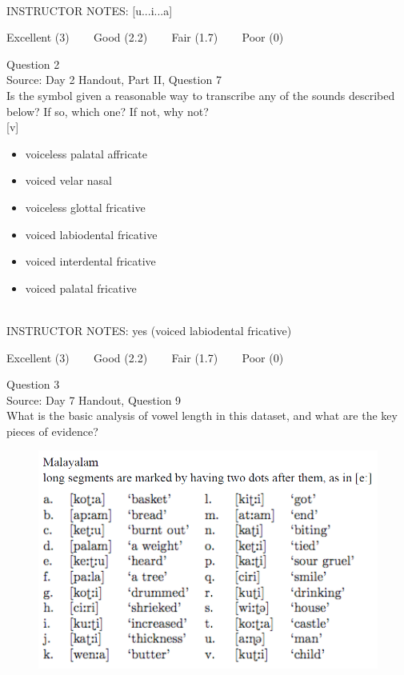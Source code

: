 \documentclass[12pt]{article}
\begin{document}
~\\
INSTRUCTOR NOTES: [u...i...a]


\vfill
Excellent (3) ~~~ Good (2.2) ~~~ Fair (1.7) ~~~ Poor (0)
\newpage

{\large Question 2}\\

Source: Day 2 Handout, Part II, Question 7\\

Is the symbol given a reasonable way to transcribe any of the sounds described below? If so, which one? If not, why not?\\

{[v]}

\begin{itemize} \item voiceless palatal affricate \item voiced velar nasal \item voiceless glottal fricative \item voiced labiodental fricative \item voiced interdental fricative \item voiced palatal fricative \end{itemize}


~\\
INSTRUCTOR NOTES: yes (voiced labiodental fricative)


\vfill
Excellent (3) ~~~ Good (2.2) ~~~ Fair (1.7) ~~~ Poor (0)
\newpage

{\large Question 3}\\

Source: Day 7 Handout, Question 9\\

What is the basic analysis of vowel length in this dataset, and what are the key pieces of evidence?\\

\begin{figure}[H]
\includegraphics{../images/malayalam.png}
\end{figure}
\end{document}
